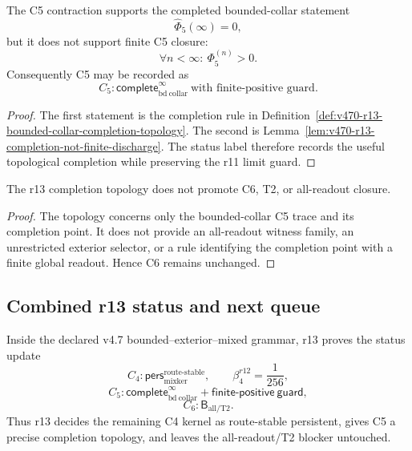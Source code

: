 \begin{proposition}
\label{prop:v470-r13-c5-completion-topology-check}
The C5 contraction supports the completed bounded-collar statement
\[
\widehat{\Phi}_5(\infty)=0,
\]
but it does not support finite C5 closure:
\[
\forall n<\infty:\ \Phi_5^{(n)}>0.
\]
Consequently C5 may be recorded as
\[
C_5:\mathsf{complete}_{\mathrm{bd\ collar}}^{\infty}\ \text{with finite-positive guard}.
\]
\end{proposition}

\begin{proof}
The first statement is the completion rule in
Definition~\ref{def:v470-r13-bounded-collar-completion-topology}.  The second is
Lemma~\ref{lem:v470-r13-completion-not-finite-discharge}.  The status label
therefore records the useful topological completion while preserving the r11
limit guard.
\end{proof}

\begin{corollary}[No C5-to-C6 promotion]
\label{cor:v470-r13-no-c5-to-c6-promotion}
The r13 completion topology does not promote C6, T2, or all-readout closure.
\end{corollary}

\begin{proof}
The topology concerns only the bounded-collar C5 trace and its completion point.
It does not provide an all-readout witness family, an unrestricted exterior
selector, or a rule identifying the completion point with a finite global
readout.  Hence C6 remains unchanged.
\end{proof}

\subsection{Combined r13 status and next queue}
\label{subsec:v470-r13-combined-status}

\begin{theorem}
\label{thm:v470-r13-mixed-kernel-topology-theorem}
Inside the declared v4.7 bounded--exterior--mixed grammar, r13 proves the status
update
\[
C_4:\mathsf{pers}_{\mathrm{mixker}}^{\mathrm{route\mbox{-}stable}},
\qquad
\beta_4^{r12}=\frac1{256},
\]
\[
C_5:\mathsf{complete}_{\mathrm{bd\ collar}}^{\infty}
+\mathsf{finite\mbox{-}positive\ guard},
\]
\[
C_6:\mathsf B_{\mathrm{all/T2}}.
\]
Thus r13 decides the remaining C4 kernel as route-stable persistent, gives C5 a
precise completion topology, and leaves the all-readout/T2 blocker untouched.
\end{theorem}

